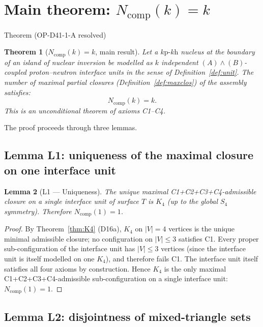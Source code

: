 \documentclass[11pt,a4paper]{article}
\newtheorem{theorem}{Theorem}[section]
\newtheorem{lemma}[theorem]{Lemma}
\theoremstyle{definition}
\theoremstyle{remark}
\newcommand{\Kfour}{K_4}
\newcommand{\Tpdl}{T}
\newcommand{\Ncomp}{N_{\mathrm{comp}}}
\newcommand{\kph}{k\text{p-}k\text{h}}
\begin{document}
\section{Main theorem: \texorpdfstring{$\Ncomp(k) = k$}{Ncomp(k) = k}}
\label{sec:maintheorem}

\begin{pdltheorem}{Theorem (OP-D41-1-A resolved)}
\begin{theorem}[$\Ncomp(k) = k$, main result]
\label{thm:main}
Let a $\kph$ nucleus at the boundary of an island of nuclear inversion be modelled as $k$ independent $(A)\wedge(B)$-coupled proton--neutron interface units in the sense of Definition~\ref{def:unit}. The number of maximal partial closures (Definition~\ref{def:maxclos}) of the assembly satisfies:
\begin{equation}
  \Ncomp(k) = k.
  \label{eq:main}
\end{equation}
This is an unconditional theorem of axioms C1--C4.
\end{theorem}
\end{pdltheorem}

The proof proceeds through three lemmas.

\subsection{Lemma L1: uniqueness of the maximal closure on one interface unit}

\begin{lemma}[L1 --- Uniqueness]
\label{lem:L1}
The unique maximal C1+C2+C3+C4-admissible closure on a single interface unit of surface $\Tpdl$ is $\Kfour$ (up to the global $S_4$ symmetry). Therefore $\Ncomp(1) = 1$.
\end{lemma}

\begin{proof}
By Theorem~\ref{thm:K4} (D16a), $\Kfour$ on $|V|=4$ vertices is the unique minimal admissible closure; no configuration on $|V| \leq 3$ satisfies C1. Every proper sub-configuration of the interface unit has $|V| \leq 3$ vertices (since the interface unit is itself modelled on one $\Kfour$), and therefore fails C1. The interface unit itself satisfies all four axioms by construction. Hence $\Kfour$ is the only maximal C1+C2+C3+C4-admissible sub-configuration on a single interface unit: $\Ncomp(1) = 1$.
\end{proof}

\subsection{Lemma L2: disjointness of mixed-triangle sets}
\end{document}
